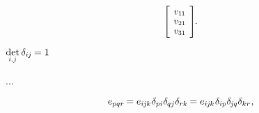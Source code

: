 \vspace{-0.2em}\noindent
{}

\nopagebreak\vspace{-0.2em}
\begin{equation*}
\scalebox{.9}{$
\left[ \hspace{-0.1ex}
\begin{array}{c}
v_{1\hspace{-0.1ex}1} \\[-0.1em]
v_{21} \\[-0.1em]
v_{31}
\end{array}
\hspace{-0.1ex} \right]
$}
\hspace{-0.2ex} .
\end{equation*}

${
\underset{\raisebox{.15em}{\scalebox{.7}{$i$,$\hspace{.15ex}j$}}}{\operatorname{det}} \hspace{.4ex} \delta_{i\hspace{-0.1ex}j} \hspace{-0.15ex} = 1
}$


...



\nopagebreak\vspace{-0.2em}\begin{equation*}
e_{pqr} \hspace{-0.2ex}
= e_{i\hspace{-0.1ex}j\hspace{-0.1ex}k} \hspace{.1ex} \delta_{pi} \delta_{\hspace{-0.1ex}qj} \delta_{rk} \hspace{-0.2ex}
= e_{i\hspace{-0.1ex}j\hspace{-0.1ex}k} \hspace{.1ex} \delta_{ip} \delta_{\hspace{-0.15ex}j\hspace{-0.1ex}q} \delta_{kr}
\hspace{.1ex} ,
\end{equation*}

